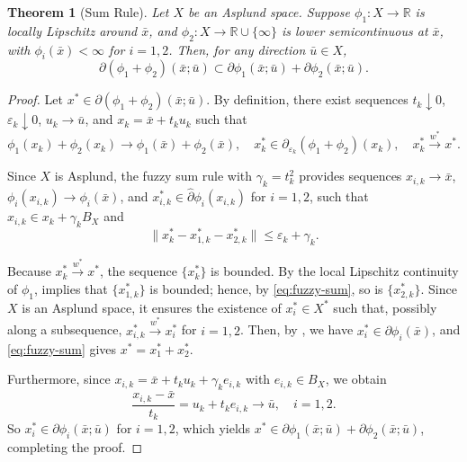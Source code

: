 \documentclass[12pt,twoside,reqno]{amsart}
\newtheorem{theorem}{Theorem}[section]
\theoremstyle{definition}
\numberwithin{equation}{section}
\begin{document}
\begin{theorem}[Sum Rule]\label{thm: sum rule}
Let \( X \) be an Asplund space.  
Suppose \( \phi_1 : X \to \mathbb{R} \) is locally Lipschitz around \( \bar{x} \), and \( \phi_2 : X \to \mathbb{R} \cup \{\infty\} \) is lower semicontinuous at \( \bar{x} \), with \( \phi_i(\bar{x}) < \infty \) for \( i = 1,2 \).  
Then, for any direction \( \bar{u} \in X \),
\[
    \partial(\phi_1 + \phi_2)(\bar{x}; \bar{u})
    \subset \partial \phi_1(\bar{x}; \bar{u}) + \partial \phi_2(\bar{x}; \bar{u}).
\]
\end{theorem}

\begin{proof}
Let \( x^* \in \partial(\phi_1 + \phi_2)(\bar{x}; \bar{u}) \).  
By definition, there exist sequences \( t_k \downarrow 0 \), \( \varepsilon_k \downarrow 0 \), \( u_k \to \bar{u} \), and \( x_k = \bar{x} + t_k u_k \) such that
\[
    \phi_1(x_k) + \phi_2(x_k) \to \phi_1(\bar{x}) + \phi_2(\bar{x}), 
    \quad 
    x_k^* \in \hat{\partial}_{\varepsilon_k}(\phi_1 + \phi_2)(x_k),
    \quad 
    x_k^* \xrightarrow{w^*} x^*.
\]

Since \( X \) is Asplund, the fuzzy sum rule 
\cite[Theorem~2.33(b)]{Mordukhovich2006variational}    
with \( \gamma_k = t_k^2 \) provides sequences 
\( x_{i,k} \to \bar{x} \), \( \phi_i(x_{i,k}) \to \phi_i(\bar{x}) \), and 
\( x_{i,k}^* \in \hat{\partial} \phi_i(x_{i,k}) \) for \( i = 1,2 \),  
such that \( x_{i,k} \in x_k + \gamma_k B_X \) and
\begin{equation}\label{eq:fuzzy-sum}
    \|x_k^* - x_{1,k}^* - x_{2,k}^*\| \le \varepsilon_k + \gamma_k.
\end{equation}

Because \( x_k^* \xrightarrow{w^*} x^* \), the sequence \( \{x_k^*\} \) is bounded.  
By the local Lipschitz continuity of \( \phi_1 \),  
\cite[Proposition~1.85(ii)]{Mordukhovich2006variational} implies that \( \{x_{1,k}^*\} \) is bounded; hence, by \eqref{eq:fuzzy-sum}, so is \( \{x_{2,k}^*\} \).  
Since $X$ is an Asplund space, it ensures the existence of \( x_i^* \in X^* \) such that, possibly along a subsequence,  
\( x_{i,k}^* \xrightarrow{w^*} x_i^* \) for \( i = 1,2 \).  
Then, by \cite[Theorem~1.89]{Mordukhovich2006variational}, we have \( x_i^* \in \partial \phi_i(\bar{x}) \), and \eqref{eq:fuzzy-sum} gives \( x^* = x_1^* + x_2^* \).

Furthermore, since \( x_{i,k} = \bar{x} + t_k u_k + \gamma_k e_{i,k} \) with \( e_{i,k} \in B_X \), we obtain
\[
    \frac{x_{i,k} - \bar{x}}{t_k} = u_k + t_k e_{i,k} \to \bar{u}, \quad i = 1,2.
\]
So \( x_i^* \in \partial \phi_i(\bar{x}; \bar{u}) \) for \( i = 1,2 \), which yields $x^* \in \partial \phi_1(\bar{x}; \bar{u}) + \partial \phi_2(\bar{x}; \bar{u})$, 
completing the proof. 
\end{proof}
\end{document}
